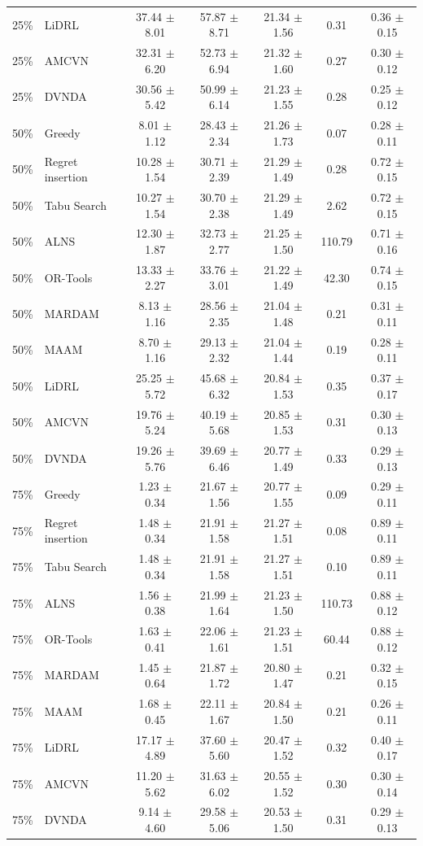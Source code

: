 \begin{tabular}{clccccc}
25\% & LiDRL & 37.44 $\pm$ 8.01 & 57.87 $\pm$ 8.71 & 21.34 $\pm$ 1.56 & 0.31 & 0.36 $\pm$ 0.15 \\
25\% & AMCVN & 32.31 $\pm$ 6.20 & 52.73 $\pm$ 6.94 & 21.32 $\pm$ 1.60 & 0.27 & 0.30 $\pm$ 0.12 \\
25\% & DVNDA & 30.56 $\pm$ 5.42 & 50.99 $\pm$ 6.14 & 21.23 $\pm$ 1.55 & 0.28 & 0.25 $\pm$ 0.12 \\
50\% & Greedy & 8.01 $\pm$ 1.12 & 28.43 $\pm$ 2.34 & 21.26 $\pm$ 1.73 & 0.07 & 0.28 $\pm$ 0.11 \\
50\% & Regret insertion & 10.28 $\pm$ 1.54 & 30.71 $\pm$ 2.39 & 21.29 $\pm$ 1.49 & 0.28 & 0.72 $\pm$ 0.15 \\
50\% & Tabu Search & 10.27 $\pm$ 1.54 & 30.70 $\pm$ 2.38 & 21.29 $\pm$ 1.49 & 2.62 & 0.72 $\pm$ 0.15 \\
50\% & ALNS & 12.30 $\pm$ 1.87 & 32.73 $\pm$ 2.77 & 21.25 $\pm$ 1.50 & 110.79 & 0.71 $\pm$ 0.16 \\
50\% & OR-Tools & 13.33 $\pm$ 2.27 & 33.76 $\pm$ 3.01 & 21.22 $\pm$ 1.49 & 42.30 & 0.74 $\pm$ 0.15 \\
50\% & MARDAM & 8.13 $\pm$ 1.16 & 28.56 $\pm$ 2.35 & 21.04 $\pm$ 1.48 & 0.21 & 0.31 $\pm$ 0.11 \\
50\% & MAAM & 8.70 $\pm$ 1.16 & 29.13 $\pm$ 2.32 & 21.04 $\pm$ 1.44 & 0.19 & 0.28 $\pm$ 0.11 \\
50\% & LiDRL & 25.25 $\pm$ 5.72 & 45.68 $\pm$ 6.32 & 20.84 $\pm$ 1.53 & 0.35 & 0.37 $\pm$ 0.17 \\
50\% & AMCVN & 19.76 $\pm$ 5.24 & 40.19 $\pm$ 5.68 & 20.85 $\pm$ 1.53 & 0.31 & 0.30 $\pm$ 0.13 \\
50\% & DVNDA & 19.26 $\pm$ 5.76 & 39.69 $\pm$ 6.46 & 20.77 $\pm$ 1.49 & 0.33 & 0.29 $\pm$ 0.13 \\
75\% & Greedy & 1.23 $\pm$ 0.34 & 21.67 $\pm$ 1.56 & 20.77 $\pm$ 1.55 & 0.09 & 0.29 $\pm$ 0.11 \\
75\% & Regret insertion & 1.48 $\pm$ 0.34 & 21.91 $\pm$ 1.58 & 21.27 $\pm$ 1.51 & 0.08 & 0.89 $\pm$ 0.11 \\
75\% & Tabu Search & 1.48 $\pm$ 0.34 & 21.91 $\pm$ 1.58 & 21.27 $\pm$ 1.51 & 0.10 & 0.89 $\pm$ 0.11 \\
75\% & ALNS & 1.56 $\pm$ 0.38 & 21.99 $\pm$ 1.64 & 21.23 $\pm$ 1.50 & 110.73 & 0.88 $\pm$ 0.12 \\
75\% & OR-Tools & 1.63 $\pm$ 0.41 & 22.06 $\pm$ 1.61 & 21.23 $\pm$ 1.51 & 60.44 & 0.88 $\pm$ 0.12 \\
75\% & MARDAM & 1.45 $\pm$ 0.64 & 21.87 $\pm$ 1.72 & 20.80 $\pm$ 1.47 & 0.21 & 0.32 $\pm$ 0.15 \\
75\% & MAAM & 1.68 $\pm$ 0.45 & 22.11 $\pm$ 1.67 & 20.84 $\pm$ 1.50 & 0.21 & 0.26 $\pm$ 0.11 \\
75\% & LiDRL & 17.17 $\pm$ 4.89 & 37.60 $\pm$ 5.60 & 20.47 $\pm$ 1.52 & 0.32 & 0.40 $\pm$ 0.17 \\
75\% & AMCVN & 11.20 $\pm$ 5.62 & 31.63 $\pm$ 6.02 & 20.55 $\pm$ 1.52 & 0.30 & 0.30 $\pm$ 0.14 \\
75\% & DVNDA & 9.14 $\pm$ 4.60 & 29.58 $\pm$ 5.06 & 20.53 $\pm$ 1.50 & 0.31 & 0.29 $\pm$ 0.13 \\
\bottomrule
\end{tabular}
